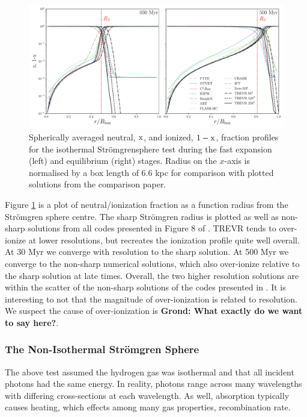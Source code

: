 \documentclass[fleq,usenatbib]{mnras}
\newcommand{\acro}{TREVR}
\newcommand{\comment}[1]{\textbf{\color{red}#1}}
\newcommand{\strom}{Str\"omgren}
\begin{document}
\begin{figure}
\includegraphics[width=0.95\linewidth]{Figures/strom_iso_fraction.pdf}
\caption{Spherically averaged neutral, $\rm x$, and ionized, $\rm 1-x$, 
fraction profiles for the isothermal \strom sphere test during the fast 
expansion (left) and equilibrium (right) stages. Radius on the $x$-axis is 
normalised by a box length of 6.6 kpc for comparison with plotted solutions 
from the \protect\cite{ilievEt06} comparison paper.}
\label{fig:stromiso}
\end{figure}
Figure \ref{fig:stromiso} is a plot of neutral/ionization fraction as a 
function radius from the \strom{} sphere centre. The sharp \strom{} radius is 
plotted as well as non-sharp solutions from all codes presented in Figure 8 
of \cite{ilievEt06}. \acro{} tends to over-ionize at lower resolutions, but 
recreates the ionization profile quite well overall. At 30 Myr we converge 
with resolution to the sharp solution. At 500 Myr we converge to the non-sharp 
numerical solutions, which also over-ionize relative to the sharp solution at 
late times. Overall, the two higher resolution solutions are within the 
scatter of the non-sharp solutions of the codes presented in \cite{ilievEt06}. 
It is interesting to not that the magnitude of over-ionization is related to 
resolution. We suspect the cause of over-ionization is \comment{Grond: What 
exactly do we want to say here?}.

\subsubsection{The Non-Isothermal \strom{} Sphere}
The above test assumed the hydrogen gas was isothermal and that all incident 
photons had the same energy. In reality, photons range across many wavelengths 
with differing cross-sections at each wavelength. As well, absorption 
typically causes heating, which effects among many gas properties, 
recombination rate.
\end{document}
